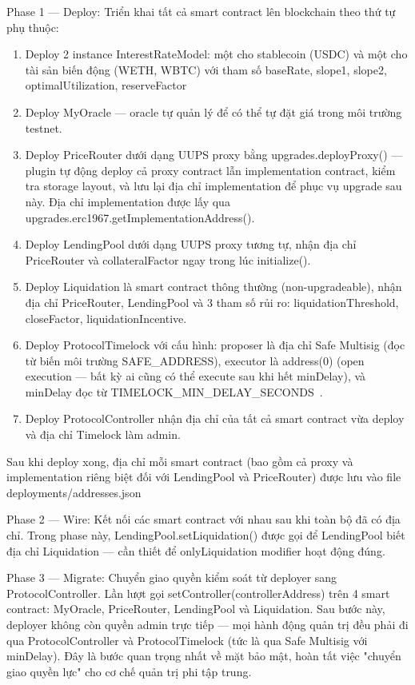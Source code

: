 \documentclass[../DoAn.tex]{subfiles}
\begin{document}
Phase 1 --- Deploy: Triển khai tất cả smart contract lên blockchain theo thứ tự phụ thuộc:

\begin{enumerate}
  \item Deploy 2 instance InterestRateModel: một cho stablecoin (USDC) và một cho tài sản biến động (WETH, WBTC) với tham số baseRate, slope1, slope2, optimalUtilization, reserveFactor
  \item Deploy MyOracle --- oracle tự quản lý để có thể tự đặt giá trong môi trường testnet.
  \item Deploy PriceRouter dưới dạng UUPS proxy bằng upgrades.deployProxy() --- plugin tự động deploy cả proxy contract lẫn implementation contract, kiểm tra storage layout, và lưu lại địa chỉ implementation để phục vụ upgrade sau này. Địa chỉ implementation được lấy qua upgrades.erc1967.getImplementationAddress().
  \item Deploy LendingPool dưới dạng UUPS proxy tương tự, nhận địa chỉ PriceRouter và collateralFactor ngay trong lúc initialize().
  \item Deploy Liquidation là smart contract thông thường (non-upgradeable), nhận địa chỉ PriceRouter, LendingPool và 3 tham số rủi ro: liquidationThreshold, closeFactor, liquidationIncentive.
  \item Deploy ProtocolTimelock với cấu hình: proposer là địa chỉ Safe Multisig (đọc từ biến môi trường SAFE\_ADDRESS), executor là address(0) (open execution --- bất kỳ ai cũng có thể execute sau khi hết minDelay), và minDelay đọc từ TIMELOCK\_MIN\_DELAY\_SECONDS~\cite{SafeGlobalDocs}.
  \item Deploy ProtocolController nhận địa chỉ của tất cả smart contract vừa deploy và địa chỉ Timelock làm admin.
\end{enumerate}


Sau khi deploy xong, địa chỉ mỗi smart contract (bao gồm cả proxy và implementation riêng biệt đối với LendingPool và PriceRouter) được lưu vào file deployments/addresses.json

Phase 2 --- Wire: Kết nối các smart contract với nhau sau khi toàn bộ đã có địa chỉ. Trong phase này, LendingPool.setLiquidation() được gọi để LendingPool biết địa chỉ Liquidation --- cần thiết để onlyLiquidation modifier hoạt động đúng.

Phase 3 --- Migrate: Chuyển giao quyền kiểm soát từ deployer sang ProtocolController. Lần lượt gọi setController(controllerAddress) trên 4 smart contract: MyOracle, PriceRouter, LendingPool và Liquidation. Sau bước này, deployer không còn quyền admin trực tiếp --- mọi hành động quản trị đều phải đi qua ProtocolController và ProtocolTimelock (tức là qua Safe Multisig với minDelay). Đây là bước quan trọng nhất về mặt bảo mật, hoàn tất việc "chuyển giao quyền lực" cho cơ chế quản trị phi tập trung.
\end{document}
